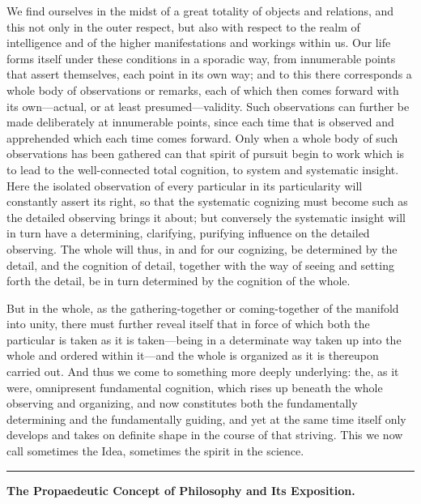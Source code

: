 \documentclass[12pt,a4paper]{book}
\newcommand{\grouphead}[1]{%
  \bigskip\begin{center}\large\textbf{#1}\end{center}\smallskip}
\begin{document}
We find ourselves in the midst of a great totality of objects and relations, and
this not only in the outer respect, but also with respect to the realm of
intelligence and of the higher manifestations and workings within us. Our life
forms itself under these conditions in a sporadic way, from innumerable points
that assert themselves, each point in its own way; and to this there corresponds a
whole body of observations or remarks, each of which then comes forward with its
own---actual, or at least presumed---validity. Such observations can further be
made deliberately at innumerable points, since each time that is observed and
apprehended which each time comes forward. Only when a whole body of such
observations has been gathered can that spirit of pursuit begin to work which is
to lead to the well-connected total cognition, to system and systematic insight.
Here the isolated observation of every particular in its particularity will
constantly assert its right, so that the systematic cognizing must become such as
the detailed observing brings it about; but conversely the systematic insight will
in turn have a determining, clarifying, purifying influence on the detailed
observing. The whole will thus, in and for our cognizing, be determined by the
detail, and the cognition of detail, together with the way of seeing and setting
forth the detail, be in turn determined by the cognition of the whole.

But in the whole, as the gathering-together or coming-together of the manifold
into unity, there must further reveal itself that in force of which both the
particular is taken as it is taken---being in a determinate way taken up into the
whole and ordered within it---and the whole is organized as it is thereupon
carried out. And thus we come to something more deeply underlying: the, as it
were, omnipresent fundamental cognition, which rises up beneath the whole
observing and organizing, and now constitutes both the fundamentally determining
and the fundamentally guiding, and yet at the same time itself only develops and
takes on definite shape in the course of that striving. This we now call sometimes
the Idea, sometimes the spirit in the science.

\begin{center}\rule{0.18\linewidth}{0.4pt}\end{center}

\grouphead{The Propaedeutic Concept of Philosophy and Its Exposition.}
\end{document}
